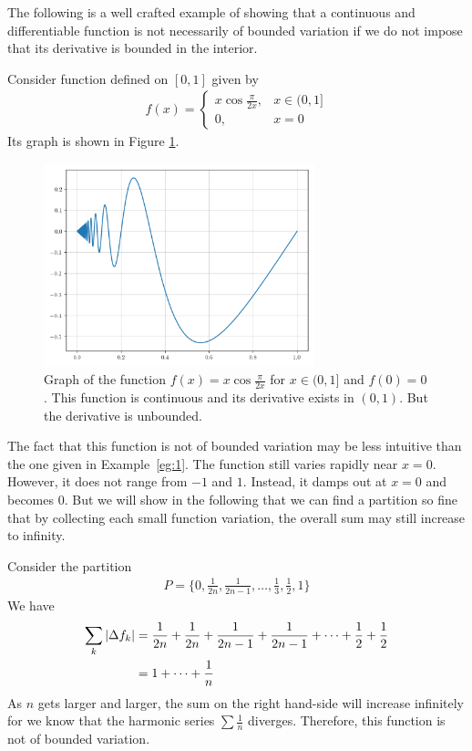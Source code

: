 \documentclass[thmcnt=section, color=blue, 12pt]{my-elegantbook}
\begin{document}
The following is a well crafted example of showing that
a continuous and differentiable function is not necessarily
of bounded variation
if we do not impose that its derivative is bounded in the interior.

\begin{example}
	Consider function defined on $[0, 1]$ given by
	\begin{align*}
		f(x) = \begin{cases}
			       x \cos \frac{\pi}{2x}, & x \in (0, 1] \\
			       0,                     & x = 0
		       \end{cases}
	\end{align*}
	Its graph is shown in Figure \ref{fig:2}.

	\begin{figure}[H]
		\centering
		\includegraphics[width=0.7\textwidth]{figures/continuous-function-that-is-not-of-bounded-variation.png}
		\caption{Graph of the function $f(x) = x \cos \frac{\pi}{2x}$ for $x \in (0, 1]$ and $f(0) = 0$. This function is continuous and its derivative exists in $(0, 1)$. But the derivative is unbounded.}
		\label{fig:2}
	\end{figure}

	The fact that this function is not of bounded variation may be less intuitive
	than the one given in Example~\ref{eg:1}.
	The function still varies rapidly near $x=0$.
	However, it does not range from $-1$ and $1$.
	Instead, it damps out at $x=0$ and becomes $0$.
	But we will show in the following that we can find a partition so fine that
	by collecting each small function variation,
	the overall sum may still increase to infinity.

	Consider the partition
	\begin{align*}
		P = \{0, \frac{1}{2n}, \frac{1}{2n - 1}, \dots, \frac{1}{3}, \frac{1}{2}, 1\}
	\end{align*}
	We have
	\begin{align*}
		\sum_k \left\lvert \Delta f_k \right\rvert
		 & = \frac{1}{2n} + \frac{1}{2n} + \frac{1}{2n - 1} + \frac{1}{2n - 1}
		+ \dots + \frac{1}{2} + \frac{1}{2}                                    \\
		 & = 1 + \cdots + \frac{1}{n}
	\end{align*}
	As $n$ gets larger and larger,
	the sum on the right hand-side will increase infinitely
	for we know that the harmonic series $\sum \frac{1}{n}$ diverges.
	Therefore, this function is not of bounded variation.
\end{example}
\end{document}
